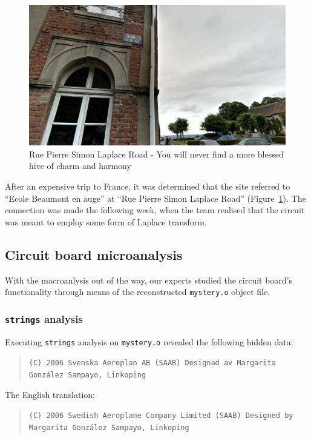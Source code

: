 \begin{figure}[h]
    \centering
    \includegraphics[width=0.95\columnwidth]{img/laplace-road.png}
    \caption{Rue Pierre Simon Laplace Road - You will never find a more blessed hive of charm and harmony}
    \label{fig:laplace-road}
\end{figure}


After an expensive trip to France, it was determined that the site referred to ``Ecole Beaumont en auge'' at ``Rue Pierre Simon Laplace Road'' (Figure~\ref{fig:laplace-road}). The connection was made the following week, when the team realised that the circuit was meant to employ some form of Laplace transform.


\subsection{Circuit board microanalysis}

With the macroanlysis out of the way, our experts studied the circuit board's functionality through means of the reconstructed \texttt{mystery.o} object file.



\subsubsection{\texttt{strings} analysis}
Executing \texttt{strings} analysis on \texttt{mystery.o} revealed the following hidden data:

\begin{quote}
\texttt{(C) 2006 Svenska Aeroplan AB (SAAB) Designad av Margarita Gonz\'{a}lez Sampayo, Linkoping}
\end{quote}

The English translation:
\begin{quote}
\texttt{(C) 2006 Swedish Aeroplane Company Limited (SAAB) Designed by Margarita Gonz\'{a}lez Sampayo, Linkoping}
\end{quote}


